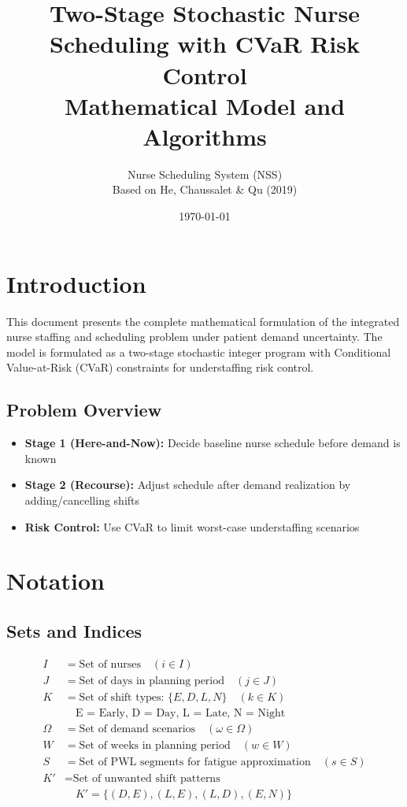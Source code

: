 \documentclass[12pt,a4paper]{article}
\title{\textbf{Two-Stage Stochastic Nurse Scheduling with CVaR Risk Control}\\
\large Mathematical Model and Algorithms}
\author{Nurse Scheduling System (NSS)\\
Based on He, Chaussalet \& Qu (2019)}
\date{\today}
\begin{document}
\maketitle

\tableofcontents
\newpage

\section{Introduction}

This document presents the complete mathematical formulation of the integrated nurse staffing and scheduling problem under patient demand uncertainty. The model is formulated as a two-stage stochastic integer program with Conditional Value-at-Risk (CVaR) constraints for understaffing risk control.

\subsection{Problem Overview}

\begin{itemize}
    \item \textbf{Stage 1 (Here-and-Now):} Decide baseline nurse schedule before demand is known
    \item \textbf{Stage 2 (Recourse):} Adjust schedule after demand realization by adding/cancelling shifts
    \item \textbf{Risk Control:} Use CVaR to limit worst-case understaffing scenarios
\end{itemize}

\section{Notation}

\subsection{Sets and Indices}

\begin{tcolorbox}[title=Sets]
\begin{align*}
I &= \text{Set of nurses} \quad (i \in I) \\
J &= \text{Set of days in planning period} \quad (j \in J) \\
K &= \text{Set of shift types: } \{E, D, L, N\} \quad (k \in K) \\
&\quad \text{E = Early, D = Day, L = Late, N = Night} \\
\Omega &= \text{Set of demand scenarios} \quad (\omega \in \Omega) \\
W &= \text{Set of weeks in planning period} \quad (w \in W) \\
S &= \text{Set of PWL segments for fatigue approximation} \quad (s \in S) \\
K' &= \text{Set of unwanted shift patterns} \\
&\quad K' = \{(D,E), (L,E), (L,D), (E,N)\}
\end{align*}
\end{tcolorbox}
\end{document}
